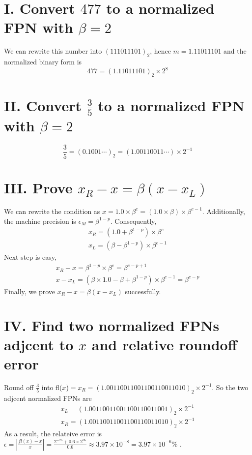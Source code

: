 \documentclass[twoside,a4paper]{article}
\begin{document}
\pagestyle{fancy}
\fancyhead{}


\section*{I. Convert $477$ to a normalized FPN with $\beta =2$}
We can rewrite this number into $(111011101)_2$, hence $m=1.11011101$ and the normalized binary form is 
\begin{equation}
477=(1.11011101)_2\times2^8
\end{equation}


\section*{II. Convert $\frac{3}{5}$ to a normalized FPN with $\beta=2$}

\begin{equation}
\frac{3}{5}=(0.1001\cdots)_2=(1.00110011\cdots)\times2^{-1}
\end{equation}

\section*{III. Prove $x_R-x=\beta(x-x_L)$}
We can rewrite the condition as  $x=1.0 \times {\beta}^e=(1.0\times\beta)\times\beta^{e-1}$. Additionally, the machine precision is $\epsilon_M=\beta^{1-p}$. Consequently,
\begin{gather}
x_R=(1.0+\beta^{1-p})\times\beta^e \\
x_L=(\beta-\beta^{1-p})\times\beta^{e-1}
\end{gather}
Next step is easy,
\begin{gather}
x_R-x=\beta^{1-p}\times\beta^{e}=\beta^{e-p+1} \\
x-x_L=(\beta\times1.0-\beta+\beta^{1-p})\times\beta^{e-1}=\beta^{e-p}
\end{gather}
Finally, we prove $x_R-x=\beta(x-x_L)$ successfully.

\section*{IV. Find two normalized FPNs adjcent to $x$ and relative roundoff error}
Round off $\frac{3}{5}$ into fl($x$)$=x_R=(1.00110011001100110011010)_2\times2^{-1}$. So the two adjcent normalized FPNs are
\begin{gather}
x_L=(1.00110011001100110011001)_2\times2^{-1} \\
x_R=(1.00110011001100110011010)_2\times2^{-1}
\end{gather} 
As a result, the relateive error is $\epsilon=|\frac{fl(x)-x}{x}|=\frac{2^{-26}+0.6\times2^{26}}{0.6}\approx3.97\times10^{-8}=3.97\times10^{-6}\%$ .
\end{document}
